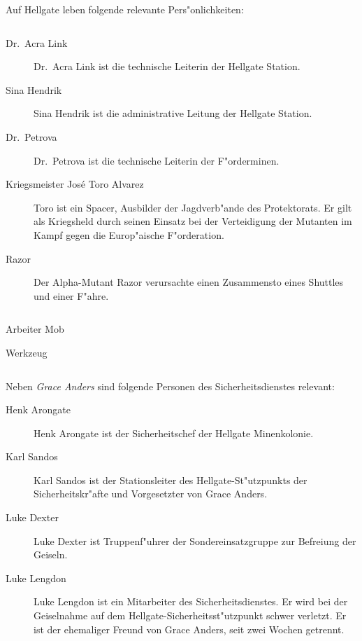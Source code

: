 
Auf Hellgate leben folgende relevante Pers"onlichkeiten:

\begin{column}[l]{0.45}
    \begin{description}
        \item[Dr.~Acra Link] Dr.~Acra Link ist die technische Leiterin der Hellgate Station.
        \item[Sina Hendrik] Sina Hendrik ist die administrative Leitung der Hellgate Station.
        \item[Dr.~Petrova] Dr.~Petrova ist die technische Leiterin der F"orderminen.
        \item[Kriegsmeister Jos\'{e} \frqq{}Toro\flqq{} Alvarez] Toro ist ein Spacer, Ausbilder der Jagdverb"ande des Protektorats. Er gilt 
            als Kriegsheld durch seinen Einsatz bei der Verteidigung der Mutanten im Kampf gegen die Europ"aische F"orderation.
        \item[Razor] Der Alpha-Mutant Razor verursachte einen Zusammensto\3 eines Shuttles und einer F"ahre.
    \end{description}
\end{column}
\begin{column}[r]{0.45}
    \begin{nscsheet}[h]{Arbeiter Mob}
        \nscstats[]
        \nscruler
        \begin{nscinventory}
            \nscitem[Waffen] Werkzeug
        \end{nscinventory}
    \end{nscsheet}
\end{column}


Neben \emph{Grace Anders} sind folgende Personen des Sicherheitsdienstes relevant:

\begin{description}
    \item[Henk Arongate] Henk Arongate ist der Sicherheitschef der Hellgate Minenkolonie.
    \item[Karl Sandos] Karl Sandos ist der Stationsleiter des Hellgate-St"utzpunkts der Sicherheitskr"afte und Vorgesetzter von Grace 
        Anders.
    \item[Luke Dexter] Luke Dexter ist Truppenf"uhrer der Sondereinsatzgruppe zur Befreiung der Geiseln.
    \item[Luke Lengdon] Luke Lengdon ist ein Mitarbeiter des Sicherheitsdienstes. Er wird bei der Geiselnahme auf dem 
        Hellgate-Sicherheitsst"utzpunkt schwer verletzt. Er ist der ehemaliger Freund von Grace Anders, seit zwei Wochen getrennt.
\end{description}

\vfill\pagebreak